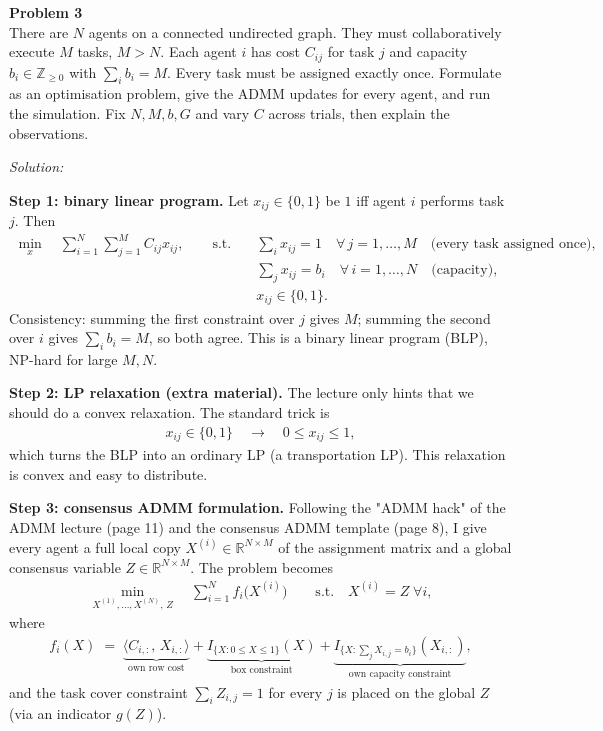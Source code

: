 \documentclass[a4paper, 11pt]{article}
\newenvironment{problem}[2][Problem]
    { \begin{mdframed}[backgroundcolor=gray!20] \textbf{#1 #2} \\}
    {  \end{mdframed}}
\newenvironment{solution}
    {\textit{Solution:}}
    {}
\begin{document}
\begin{problem}{3}
There are $N$ agents on a connected undirected graph. They must collaboratively execute $M$ tasks, $M > N$. Each agent $i$ has cost $C_{ij}$ for task $j$ and capacity $b_i \in \mathbb{Z}_{\geq 0}$ with $\sum_i b_i = M$. Every task must be assigned exactly once. Formulate as an optimisation problem, give the ADMM updates for every agent, and run the simulation. Fix $N, M, b, G$ and vary $C$ across trials, then explain the observations.
\end{problem}
\begin{solution}

\textbf{Step 1: binary linear program.} Let $x_{ij} \in \{0, 1\}$ be $1$ iff agent $i$ performs task $j$. Then
\begin{align*}
    \min_{x} \quad \sum_{i=1}^{N} \sum_{j=1}^{M} C_{ij} x_{ij}, \qquad \text{s.t.} \quad &\sum_i x_{ij} = 1 \quad \forall\, j = 1, \ldots, M \quad \text{(every task assigned once)},\\
    &\sum_j x_{ij} = b_i \quad \forall\, i = 1, \ldots, N \quad \text{(capacity)},\\
    &x_{ij} \in \{0, 1\}.
\end{align*}
Consistency: summing the first constraint over $j$ gives $M$; summing the second over $i$ gives $\sum_i b_i = M$, so both agree. This is a binary linear program (BLP), NP-hard for large $M, N$.

\textbf{Step 2: LP relaxation (extra material).} The lecture only hints that we should do a convex relaxation. The standard trick is
\begin{align*}
    x_{ij} \in \{0, 1\} \quad \longrightarrow \quad 0 \le x_{ij} \le 1,
\end{align*}
which turns the BLP into an ordinary LP (a transportation LP). This relaxation is convex and easy to distribute.

\textbf{Step 3: consensus ADMM formulation.} Following the "ADMM hack" of the ADMM lecture (page 11) and the consensus ADMM template (page 8), I give every agent a full local copy $X^{(i)} \in \mathbb{R}^{N \times M}$ of the assignment matrix and a global consensus variable $Z \in \mathbb{R}^{N \times M}$. The problem becomes
\begin{align*}
    \min_{X^{(1)}, \ldots, X^{(N)},\, Z} \quad \sum_{i=1}^{N} f_i\big(X^{(i)}\big) \qquad \text{s.t.} \quad X^{(i)} = Z \; \forall i,
\end{align*}
where
\begin{align*}
    f_i(X) \;=\; \underbrace{\big\langle C_{i,:},\, X_{i,:} \big\rangle}_{\text{own row cost}} + \underbrace{I_{\{X : 0 \le X \le 1\}}(X)}_{\text{box constraint}} + \underbrace{I_{\{X : \sum_j X_{i,j} = b_i\}}(X_{i,:})}_{\text{own capacity constraint}},
\end{align*}
and the task cover constraint $\sum_i Z_{i,j} = 1$ for every $j$ is placed on the global $Z$ (via an indicator $g(Z)$).


\end{solution}
\end{document}
